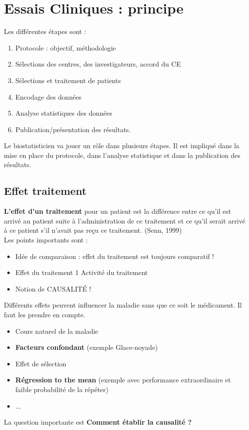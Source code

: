 \section{Essais Cliniques : principe}
Les différentes étapes sont :
\begin{enumerate}
    \item Protocole : objectif, méthodologie
    \item Sélections des centres, des investigateurs, accord du CE
    \item Sélections et traitement de patients
    \item Encodage des données
    \item Analyse statistiques des données
    \item Publication/présentation des résultats.
\end{enumerate}
\vspace{0.15cm}
Le biostatisticien va jouer un rôle dans plusieurs étapes. Il est impliqué dans la mise en place du protocole, dans l'analyse statistique et dans la publication des résultats. 

\subsection{Effet traitement}
\textbf{L’effet d’un traitement} pour un patient est la différence entre ce qu’il est arrivé au patient suite à l’administration de ce traitement et ce qu’il serait arrivé à ce patient s’il n’avait pas reçu ce traitement. (Senn, 1999)\\

Les points importants sont : 
\begin{itemize}
    \item Idée de comparaison : effet du traitement est toujours comparatif ! \item Effet du traitement 1 Activité du traitement
    \item Notion de CAUSALITÉ !
\end{itemize}
\vspace{0.15cm}
Différents effets peuvent influencer la maladie sans que ce soit le médicament. Il faut les prendre en compte.\\

\begin{itemize}
    \item Cours naturel de la maladie 
    \item \textbf{Facteurs confondant} (exemple Glace-noyade)
    \item Effet de sélection
     \item \textbf{ Régression to the mean} (exemple avec performance extraordinaire et faible probabilité de la répéter)
     \item ...
\end{itemize}
\vspace{0.15cm}
La question importante est \textbf{Comment établir la causalité ?}\\

